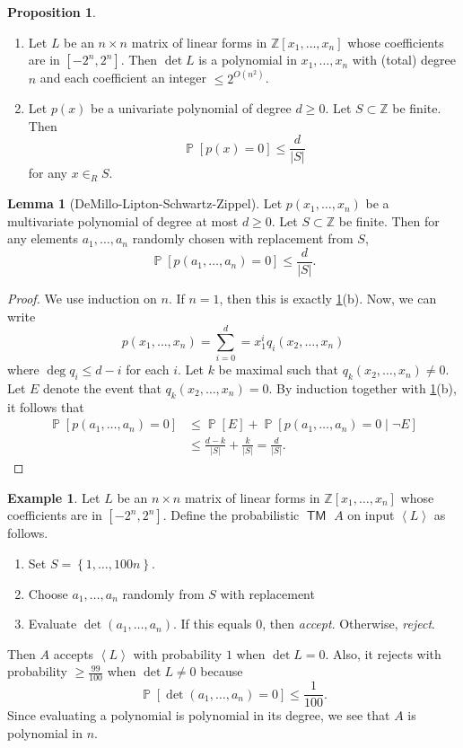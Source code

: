 \documentclass[10pt,letterpaper,cm]{nupset}
\theoremstyle{definition}
\newtheorem{exmp}[definition]{Example}
\theoremstyle{theorem}
\newtheorem{lemma}[definition]{Lemma}
\newtheorem{prop}[definition]{Proposition}
\theoremstyle{remark}
\newcommand{\Z}{\mathbb Z}
\newcommand{\1}{\mathbf{1}}
\newcommand{\0}{\vec 0}
\DeclareMathOperator{\pr}{\mathbb{P}}
\DeclareMathOperator{\TM}{\mathsf{TM}}
\begin{document}
\begin{prop}\label{poly} $ $
\begin{enumerate}[label=(\alph*)]
\item Let $L$ be an $n\times n$ matrix of linear forms in $\Z[x_1, \ldots, x_n]$ whose coefficients are in $\left[{-2}^n, 2^n\right]$. Then $\det{L}$ is a polynomial in $x_1, \ldots, x_n$ with (total) degree $n$ and each coefficient an integer $\leq 2^{O(n^2)}$.
\item Let $p(x)$ be a univariate polynomial of degree $d \geq 0$. Let $S\subset \Z$ be finite. Then $$\pr\left[p(x) =0\right] \leq \frac{d}{\left\lvert{S}\right\rvert}$$ for any $x\in_R S$.
\end{enumerate}
\end{prop}

\begin{lemma}[DeMillo-Lipton-Schwartz-Zippel]\label{Dem}
Let $p(x_1, \ldots, x_n)$ be a multivariate polynomial of degree at most $d\geq 0$. Let $S \subset \Z$ be finite. Then for any elements $a_1, \ldots, a_n$ randomly chosen with replacement from $S$, $$\pr\left[p(a_1, \ldots, a_n) =0\right] \leq \frac{d}{\left\lvert{S}\right\rvert}.$$
\end{lemma}
\begin{proof}
We use induction on $n$. If $n=1$, then this is exactly \cref{poly}(b). Now, we can write $$p(x_1, \ldots, x_n) = \sum_{i=0}^d = x_1^i q_i(x_2, \ldots, x_n)$$ where $\deg{q_i} \leq d-i$ for each $i$. Let $k$ be maximal such that $q_k(x_2, \ldots, x_n) \ne 0$. Let $E$ denote the event that $q_k(x_2, \ldots, x_n) =0$. 
By induction together with \cref{poly}(b), it follows that  
\begin{align*} \pr\left[p(a_1, \ldots, a_n) =0\right] & \leq \pr[E] + \pr\left[p(a_1, \ldots, a_n) =0 \mid \neg{E}\right]
\\ & \leq \frac{d-k}{\left\lvert{S}\right\rvert} + \frac{k}{\left\lvert{S}\right\rvert} = \frac{d}{\left\lvert{S}\right\rvert}.
\end{align*}
\end{proof}

\begin{exmp}\label{matrix}
Let $L$ be an $n \times n$ matrix of linear forms in $\Z[x_1, \ldots, x_n]$ whose coefficients are in $\left[{-2}^n, 2^n\right]$. Define the probabilistic $\TM$ $A$ on input $\left\langle L \right\rangle$ as follows. 
\begin{enumerate}
\item Set $S = \left\{1, \ldots, 100n\right\}$.
\item Choose $a_1, \ldots, a_n$ randomly from $S$ with replacement
\item Evaluate $\det(a_1, \ldots, a_n)$.  If this equals $0$, then \textit{accept}. Otherwise, \textit{reject}.
\end{enumerate}
Then $A$ accepts $\left\langle L \right\rangle$ with probability $1$ when $\det{L} = 0$. Also, it rejects with probability $\geq \frac{99}{100}$ when $\det{L} \ne 0$ because $$\pr\left[\det(a_1, \ldots, a_n) =0\right] \leq \frac{1}{100}.$$ Since evaluating a polynomial is polynomial in its degree, we see that $A$ is polynomial in $n$.
\end{exmp}
\end{document}
